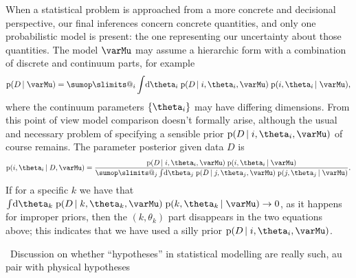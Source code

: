 \documentclass[\ifafour a4paper,12pt,\else a5paper,10pt,\fi%
onecolumn,oneside,article,%
british%
]{memoir}
\makeatletter
\theoremstyle{remark}
\theoremstyle{innote}
\def\sum{\DOTSI\sumop\slimits@}
\newcommand*{\di}{\mathrm{d}}%
\DeclarePairedDelimiter\set{\{}{\}}
\newcommand*{\pf}{\mathrm{p}}%
\renewcommand*{\|}{\nonscript\,\vert\nonscript\;\mathopen{}}
\newcommand*{\puzzle}{\maltese}
\newcommand{\mynote}[1]{ {\color{notecolour}\puzzle\ #1}}
\newcommand*{\yM}{\varMu}
\newcommand*{\yD}{D}
\makeatother
\begin{document}
\bigskip

When a statistical problem is approached from a more concrete and
decisional perspective, our final inferences concern concrete quantities,
and only one probabilistic model is present: the one representing our
uncertainty about those quantities. The model $\yM$ may assume a hierarchic form
with a combination of discrete and continuum parts, for example
\begin{equation}
  \label{eq:example_model_mixed}
  \pf(\yD \| \yM) =
 \sum_i \int\!\di\theta_i\; \pf(\yD \| i, \theta_i,\yM)\;
  \pf(i, \theta_i \| \yM),
\end{equation}
where the continuum parameters $\set{\theta_i}$ may have differing
dimensions. From this point of view model comparison doesn't formally
arise, although the usual and necessary problem of specifying a sensible
prior $\pf(\yD \| i, \theta_i,\yM)$ of course remains. The parameter
posterior given data $\yD$ is
\begin{equation}
  \label{eq:param_posterior_model_mixed}
  \pf(i, \theta_i \| \yD, \yM) =
  \frac{\pf(\yD \| i, \theta_i,\yM)\;  \pf(i, \theta_i \| \yM)
  }{
 \sum_j \int\!\di\theta_j\; \pf(\yD \| j, \theta_j,\yM)\;
  \pf(j, \theta_j \| \yM)
  }.
\end{equation}
If for a specific $k$ we have that
$\int\!\di\theta_k\; \pf(\yD \| k, \theta_k,\yM)\; \pf(k, \theta_k \| \yM)
\to 0$, as it happens for improper priors, then the $(k,\theta_k)$ part
disappears in the two equations above; this indicates that we have used a
silly prior $\pf(\yD \| i, \theta_i,\yM)$.




\mynote{Discussion on whether \enquote{hypotheses} in statistical modelling
are really such, au pair with physical hypotheses}
\end{document}
